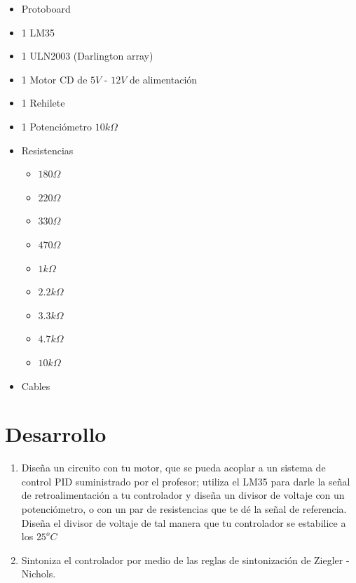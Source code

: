 	\begin{itemize}
		\item Protoboard
		\item 1 LM35
		\item 1 ULN2003 (Darlington array)
		\item 1 Motor CD de $5 V$ - $12 V$ de alimentación
		\item 1 Rehilete
		\item 1 Potenciómetro $10 k\Omega$
		\item Resistencias
		\begin{itemize}
			\item $180 \Omega$
			\item $220 \Omega$
			\item $330 \Omega$
			\item $470 \Omega$
			\item $1 k\Omega$
			\item $2.2 k\Omega$
			\item $3.3 k\Omega$
			\item $4.7 k\Omega$
			\item $10 k\Omega$
		\end{itemize}
		\item Cables
	\end{itemize}


\section{Desarrollo}

	\begin{enumerate}
		\item Diseña un circuito con tu motor, que se pueda acoplar a un sistema de control PID suministrado por el profesor; utiliza el LM35 para darle la señal de retroalimentación a tu controlador y diseña un divisor de voltaje con un potenciómetro, o con un par de resistencias que te dé la señal de referencia. Diseña el divisor de voltaje de tal manera que tu controlador se estabilice a los $25^o C$
		\item Sintoniza el controlador por medio de las reglas de sintonización de Ziegler - Nichols.
	\end{enumerate}


